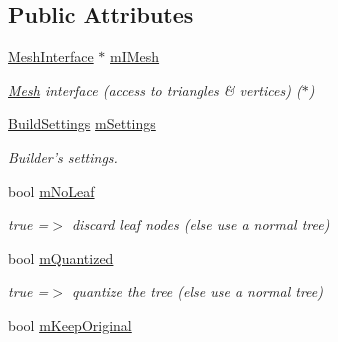\subsection*{Public Attributes}
\begin{DoxyCompactItemize}
\item 
\hypertarget{struct_o_p_c_o_d_e_c_r_e_a_t_e_a1797bb4e55484972aa0c83d830df6c05}{\hyperlink{class_mesh_interface}{Mesh\+Interface} $\ast$ \hyperlink{struct_o_p_c_o_d_e_c_r_e_a_t_e_a1797bb4e55484972aa0c83d830df6c05}{m\+I\+Mesh}}\label{struct_o_p_c_o_d_e_c_r_e_a_t_e_a1797bb4e55484972aa0c83d830df6c05}

\begin{DoxyCompactList}\small\item\em \hyperlink{class_mesh}{Mesh} interface (access to triangles \& vertices) ($\ast$) \end{DoxyCompactList}\item 
\hypertarget{struct_o_p_c_o_d_e_c_r_e_a_t_e_ab64e53cba4de4c506a1c4f9458c0e399}{\hyperlink{struct_build_settings}{Build\+Settings} \hyperlink{struct_o_p_c_o_d_e_c_r_e_a_t_e_ab64e53cba4de4c506a1c4f9458c0e399}{m\+Settings}}\label{struct_o_p_c_o_d_e_c_r_e_a_t_e_ab64e53cba4de4c506a1c4f9458c0e399}

\begin{DoxyCompactList}\small\item\em Builder's settings. \end{DoxyCompactList}\item 
\hypertarget{struct_o_p_c_o_d_e_c_r_e_a_t_e_a5698360d25cc867eedc114ee0241383d}{bool \hyperlink{struct_o_p_c_o_d_e_c_r_e_a_t_e_a5698360d25cc867eedc114ee0241383d}{m\+No\+Leaf}}\label{struct_o_p_c_o_d_e_c_r_e_a_t_e_a5698360d25cc867eedc114ee0241383d}

\begin{DoxyCompactList}\small\item\em true =$>$ discard leaf nodes (else use a normal tree) \end{DoxyCompactList}\item 
\hypertarget{struct_o_p_c_o_d_e_c_r_e_a_t_e_a8e8a898314866de0c9cfaa0015293dbd}{bool \hyperlink{struct_o_p_c_o_d_e_c_r_e_a_t_e_a8e8a898314866de0c9cfaa0015293dbd}{m\+Quantized}}\label{struct_o_p_c_o_d_e_c_r_e_a_t_e_a8e8a898314866de0c9cfaa0015293dbd}

\begin{DoxyCompactList}\small\item\em true =$>$ quantize the tree (else use a normal tree) \end{DoxyCompactList}\item 
\hypertarget{struct_o_p_c_o_d_e_c_r_e_a_t_e_a929f76c3fef9815a8964b11c52f12150}{bool \hyperlink{struct_o_p_c_o_d_e_c_r_e_a_t_e_a929f76c3fef9815a8964b11c52f12150}{m\+Keep\+Original}}\label{struct_o_p_c_o_d_e_c_r_e_a_t_e_a929f76c3fef9815a8964b11c52f12150}


\end{DoxyCompactItemize}
